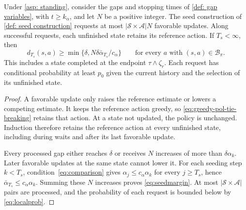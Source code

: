 \begin{lemma}[Seed]
\label{lem:seeds}
Under \autoref{asp: standing}, consider the gaps and stopping times of \autoref{def: gap variables}, with $t\ge k_\alpha$, and let $N$ be a positive integer. The seed construction of \autoref{def: seed construction} requests at most $|\mathcal S\times\mathcal A|N$ favorable updates. Along successful requests, each unfinished state retains its reference action. If $T_s<\infty$, then
\begin{equation}
\label{eq:seedmargin}
d_{T_s}(s,a)\ge\min\{\delta,N\delta\bar\alpha_{T_s}/c_\alpha\}
\qquad\text{for every }a\text{ with }(s,a)\in\mathcal B_\pi.
\end{equation}
This includes a state completed at the endpoint $\tau\wedge\zeta_r$. Each request has conditional probability at least $p_0$ given the current history and the selection of its unfinished state.
\end{lemma}
\begin{proof}
A favorable update only raises the reference estimate or lowers a competing estimate. It keeps the reference action greedy, so \eqref{eq:greedy-pol-tie-breaking} retains that action. At a state not updated, the policy is unchanged. Induction therefore retains the reference action at every unfinished state, including during waits and after its last favorable update.

Every processed gap either reaches $\delta$ or receives $N$ increases of more than $\delta\alpha_k$. Later favorable updates at the same state cannot lower it. For each seeding step $k<T_s$, condition~\eqref{eq:comparison} gives $\alpha_j\le c_\alpha\alpha_k$ for every $j\ge T_s$, hence $\bar\alpha_{T_s}\le c_\alpha\alpha_k$. Summing these $N$ increases proves \eqref{eq:seedmargin}.
At most $|\mathcal S\times\mathcal A|$ pairs are processed, and the probability of each request is bounded below by \eqref{eq:localprob}.
\end{proof}
